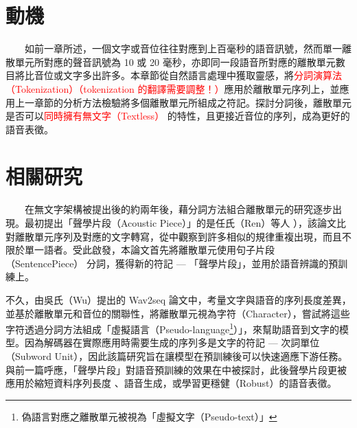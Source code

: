 
\newcommand{\jefftablesep}{\vspace{0.5cm}}\renewcommand{\arraystretch}{0.7} %

\section{動機}

　　如前一章所述，一個文字或音位往往對應到上百毫秒的語音訊號，然而單一離散單元所對應的聲音訊號為 10 或 20 毫秒，亦即同一段語音所對應的離散單元數目將比音位或文字多出許多。本章節從自然語言處理中獲取靈感，將\textcolor{red}{分詞演算法（Tokenization）\textcolor{red}{（tokenization 的翻譯需要調整！）}}應用於離散單元序列上，並應用上一章節的分析方法檢驗將多個離散單元所組成之符記。探討分詞後，離散單元是否可以\textcolor{red}{同時擁有無文字（Textless）}\cite{lakhotia_generative_2021, lakhotia_generative_2021-1, noauthor_textless_2021} 的特性，且更接近音位的序列，成為更好的語音表徵。

\section{相關研究} 

　　在無文字架構被提出後的約兩年後，藉分詞方法組合離散單元的研究逐步出現。最初提出「聲學片段（Acoustic Piece）」的是任氏（Ren）等人 \cite{ren_speech_2022}），該論文比對離散單元序列及對應的文字轉寫，從中觀察到許多相似的規律重複出現，而且不限於單一語者。受此啟發，本論文首先將離散單元使用句子片段（SentencePiece） \cite{kudo_sentencepiece_2018} 分詞，獲得新的符記 --- 「聲學片段」，並用於語音辨識的預訓練上。

        不久，由吳氏（Wu）提出的 Wav2seq \cite{wu_wav2seq_2023}論文中，考量文字與語音的序列長度差異，並基於離散單元和音位的關聯性，將離散單元視為字符（Character），嘗試將這些字符透過分詞方法組成「虛擬語言（Pseudo-language\footnote{偽語言對應之離散單元被視為「虛擬文字（Pseudo-text）」}）」，來幫助語音到文字的模型。因為解碼器在實際應用時需要生成的序列多是文字的符記 --- 次詞單位（Subword Unit），因此該篇研究旨在讓模型在預訓練後可以快速適應下游任務。與前一篇呼應，「聲學片段」對語音預訓練的效果在\cite{10096788}中被探討，此後聲學片段更被應用於縮短資料序列長度\cite{chang_exploration_2023} 、語音生成\cite{shen2024acoustic}，或學習更穩健（Robust）的語音表徵\cite{chang2023r}。


